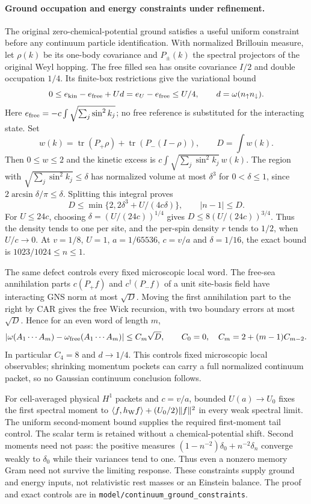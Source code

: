 \paragraph{Ground occupation and energy constraints under refinement.}
The original zero-chemical-potential ground satisfies a useful uniform
constraint before any continuum particle identification. With normalized
Brillouin measure, let $\rho(k)$ be its one-body covariance and $P_\pm(k)$
the spectral projectors of the original Weyl hopping. The free filled sea
has onsite covariance $I/2$ and double occupation $1/4$. Its finite-box
restrictions give the variational bound
\[
 0\le e_{\rm kin}-e_{\rm free}+Ud=e_U-e_{\rm free}\le U/4,
 \qquad d=\omega(n_\uparrow n_\downarrow).
\]
Here $e_{\rm free}=-c\int\sqrt{\sum_j\sin^2 k_j}$; no free reference is
substituted for the interacting state. Set
\[
 w(k)=\operatorname{tr}(P_+\rho)+\operatorname{tr}(P_-(I-\rho)),
 \qquad D=\int w(k).
\]
Then $0\le w\le2$ and the kinetic excess is
$c\int\sqrt{\sum_j\sin^2 k_j}\,w(k)$. The region with
$\sqrt{\sum_j\sin^2 k_j}\le\delta$ has normalized volume at most
$\delta^3$ for $0<\delta\le1$, since
$2\arcsin\delta/\pi\le\delta$. Splitting this integral proves
\[
 D\le\min\{2,2\delta^3+U/(4c\delta)\},\qquad |n-1|\le D.
\]
For $U\le24c$, choosing $\delta=(U/(24c))^{1/4}$ gives
$D\le8(U/(24c))^{3/4}$. Thus the density tends to one per site,
and the per-spin density $r$ tends to $1/2$, when $U/c\to0$.
At $v=1/8$, $U=1$, $a=1/65536$, $c=v/a$ and $\delta=1/16$,
the exact bound is $1023/1024\le n\le1$.

The same defect controls every fixed microscopic local word.
The free-sea annihilation parts $c(P_+f)$ and $c^\dagger(P_-f)$ of a
unit site-basis field have interacting GNS norm at most $\sqrt D$.
Moving the first annihilation part to the right by CAR gives the free
Wick recursion, with two boundary errors at most $\sqrt D$. Hence for
an even word of length $m$,
\[
 |\omega(A_1\cdots A_m)-\omega_{\rm free}(A_1\cdots A_m)|
 \le C_m\sqrt D,\qquad C_0=0,\quad C_m=2+(m-1)C_{m-2}.
\]
In particular $C_4=8$ and $d\to1/4$. This controls fixed microscopic
local observables; shrinking momentum pockets can carry a full
normalized continuum packet, so no Gaussian continuum conclusion follows.

For cell-averaged physical $H^1$ packets and $c=v/a$, bounded
$U(a)\to U_0$ fixes the first spectral moment to
$\langle f,h_{\rm W}f\rangle+(U_0/2)\|f\|^2$ in every weak spectral
limit. The uniform second-moment bound supplies the required first-moment
tail control. The scalar term is retained without a chemical-potential
shift. Second moments need not pass: the positive measures
$(1-n^{-2})\delta_0+n^{-2}\delta_n$ converge weakly to $\delta_0$
while their variances tend to one. Thus even a nonzero memory Gram need
not survive the limiting response. These constraints supply ground and
energy inputs, not relativistic rest masses or an Einstein balance.
The proof and exact controls are in
\texttt{model/continuum\_ground\_constraints}.
